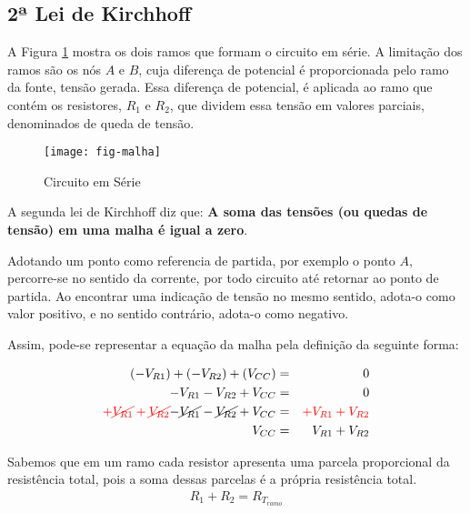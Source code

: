 









\subsection{2ª Lei de Kirchhoff}

A Figura \ref{fig:malha} mostra os dois ramos que formam o circuito em série.
A limitação dos ramos são os nós $A$ e $B$, cuja diferença de potencial é proporcionada pelo ramo da fonte, tensão gerada. Essa diferença de potencial, é aplicada ao ramo que contém os resistores, $R_1$ e $R_2$, que dividem essa tensão em valores parciais, denominados de queda de tensão.

\begin{figure}[!h]
	\centering
	\caption{Circuito em Série}
	\texttt{[image: fig-malha]}
	\label{fig:malha}
\end{figure}

A segunda lei de Kirchhoff diz que: \textbf{A soma das tensões (ou quedas de tensão) em uma malha é igual a zero}.

Adotando um ponto como referencia de partida, por exemplo o ponto $A$, percorre-se no sentido da corrente, por todo circuito até retornar ao ponto de partida. Ao encontrar uma indicação de tensão no mesmo sentido, adota-o como valor positivo, e no sentido contrário, adota-o como negativo.

Assim, pode-se representar a equação da malha pela definição da seguinte forma:

\begin{eqnarray}
	(-V_{R1}) + (-V_{R2}) + (V_{CC})  & = & 0 \\
	-V_{R1} - V_{R2} + V_{CC} & = & 0 \nonumber\\
	\color{red}{ + \cancel{ V_{R1} } + \cancel{ V_{R2} } } \color{black}{- \cancel{V_{R1}} } - \color{black}{\cancel{ V_{R2}} } + V_{CC} & = & \color{red}{+ V_{R1} + V_{R2}} \nonumber\\
	 V_{CC} & = & V_{R1} + V_{R2}
\end{eqnarray}


Sabemos que em um ramo cada resistor apresenta uma parcela proporcional da resistência total, pois a soma dessas parcelas é a própria resistência total.
\begin{eqnarray}
R_1 + R_2 = R_{T_{ramo}}
\end{eqnarray}

